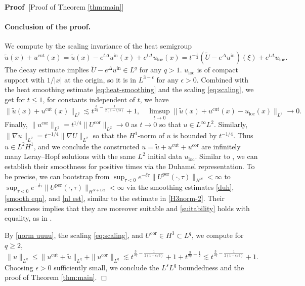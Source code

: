 \documentclass[11pt,a4paper]{article}
\numberwithin{equation}{section}
\newcommand{\tmop}[1]{\ensuremath{\operatorname{#1}}}
\newenvironment{proof}{\noindent\textbf{Proof\ }}{\hspace*{\fill}$\Box$\medskip}
\begin{document}
\begin{proof}[Proof of Theorem \ref{thm:main}]
\paragraph{Conclusion of the proof.} 
We compute by the scaling invariance of the heat semigroup%
$$\widetilde{u}(x)+u^{\text{cut}}(x)=\widetilde{u}(x)-e^{t
\Delta}u^{\text{in}}(x)+e^{t
\Delta}u_{\tmop{loc}}(x)=t^{-\frac12}(\widetilde{U}-e^{
\Delta}u^{\text{in}})(\xi)+e^{t
\Delta}u_{\tmop{loc}}.$$ The decay estimate \cite{jia2014local} implies $\widetilde{U}-e^{
\Delta}u^{\text{in}}\in L^q$ for any $q>1$. $u_{\tmop{loc}}$ is of compact support with $1/|x|$ at the origin, so it is in $L^{3-\epsilon}$ for any $\epsilon>0$. Combined with the heat smoothing estimate \eqref{eq:heat-smoothing}  and the scaling \eqref{eq:scaling}, we get for $t\leqslant1$, for constants independent of $t$, we have \begin{equation}
\|\widetilde{u}(x)+u^{\text{cut}}(x)\|_{L^q}\lesssim t^{\frac{3}{2q}-\frac{1}{2(1-\epsilon/3)}}+1,\quad \limsup_{t\to 0}\|\widetilde{u}(x)+u^{\text{cut}}(x)-u_{\tmop{loc}}(x)\|_{L^2}\to 0.
    \label{norm uuuu}
\end{equation} Finally, $\|u^{\text{cor}}\|_{L^2}=t^{1/4}\|U^{\text{cor}}\|_{L^2}\to 0$ as $t\to 0$ so that $u\in L^\infty L^2$. {Similarly, $\|\nabla u\|_{L^2}=t^{-1/4}\|\nabla U\|_{L^2}$ so that the $H^1$-norm of $u$ is bounded by $t^{-1/4}$. Thus $u\in L^2 H^1$}, and we conclude the constructed $u=\widetilde{u}+u^{\text{cut}}+u^{\text{cor}}$ are infinitely many Leray--Hopf solutions with the same $L^2$ initial data $u_{\tmop{loc}}$. 
{Similar to \cite{albritton2022non}, we can establish their smoothness for positive times via the Duhamel representation. To be precise, we can bootstrap from $\sup_{\tau<0}e^{-\delta\tau}\|U^\text{per}(\cdot,\tau)\|_{H^{N}}<\infty$ to $\sup_{\tau<0}e^{-\delta\tau}\|U^\text{per}(\cdot,\tau)\|_{H^{N+1/2}}<\infty$ via the smoothing estimates  \eqref{duh}, \eqref{smooth eqn}, and \eqref{nl est}, similar to the estimate in \eqref{H3norm-2}.} Their smoothness implies that they are moreover suitable and \eqref{suitability} holds with equality, as in \cite{albritton2022non}. %


By \eqref{norm uuuu}, the scaling \eqref{eq:scaling}, and  $U^{\text{cor}}\in H^3\subset L^q$, we compute for $q\geqslant2$,  $$\|u\|_{L^q}\leqslant\|u^{\text{cut}}+\widetilde u\|_{L^q}+\|u^{\text{cor}}\|_{L^q}\lesssim t^{\frac{3}{2q}-\frac{1}{2(1-\epsilon/3)}}+1+t^{\frac{3}{2q}-\frac12}\lesssim t^{\frac{3}{2q}-\frac{1}{2(1-\epsilon/3)}}+1.$$ Choosing $\epsilon>0$ sufficiently small, we conclude the $L^sL^q$ boundedness  and the proof of Theorem \ref{thm:main}.    
\end{proof}
\end{document}
